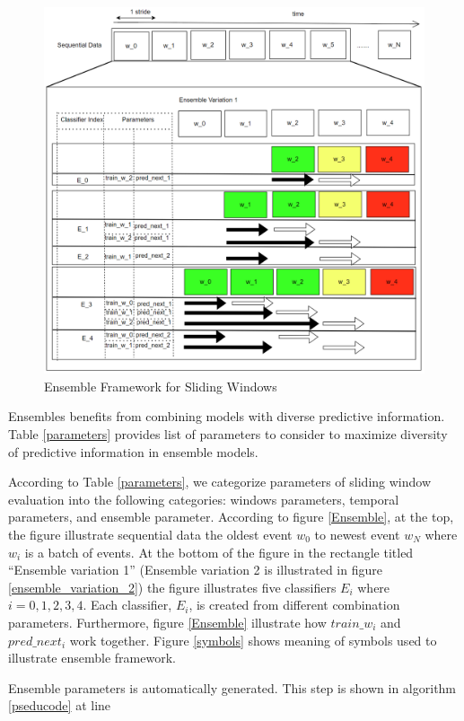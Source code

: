 \documentclass{IEEEtran}
\begin{document}
\begin{figure}[htbp]
\centering
\includegraphics[width=.9\linewidth]{./images/screenshot_20220425_110609.png}
\caption{\label{Ensemble Framework for Sliding Windows}Ensemble Framework for Sliding Windows}
\end{figure}

Ensembles benefits from combining models with diverse predictive information. Table \ref{parameters} provides list of parameters to consider to maximize diversity of predictive information in ensemble models.

According to Table \ref{parameters}, we categorize parameters of sliding window evaluation into the following categories: windows parameters, temporal parameters, and ensemble parameter. According to figure \ref{Ensemble}, at the top, the figure illustrate sequential data the oldest event \(w_0\) to newest event \(w_{N}\) where \(w_{i}\) is a batch of events. At the bottom of the figure in the rectangle titled ``Ensemble variation 1'' (Ensemble variation 2 is illustrated in figure \ref{ensemble_variation_2}) the figure illustrates five classifiers \(E_i\) where \(i = 0,1,2,3,4\). Each classifier, \(E_i\), is created from different combination parameters. Furthermore, figure \ref{Ensemble} illustrate how \(train\_w_{i}\) and \(pred\_next_{i}\) work together. Figure \ref{symbols} shows meaning of symbols used to illustrate ensemble framework.

Ensemble parameters is automatically generated. This step is shown in algorithm \ref{pseducode} at line
\end{document}

